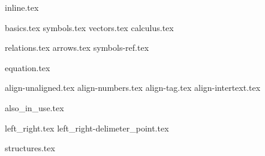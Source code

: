 \documentclass[presentatie.tex]{subfiles}
\begin{document}

\clearrecentlist

{inline.tex}

{basics.tex}
{symbols.tex}
{vectors.tex}
{calculus.tex}

{relations.tex}
{arrows.tex}
{symbols-ref.tex}

{equation.tex}


{align-unaligned.tex}
{align-numbers.tex}
{align-tag.tex}
{align-intertext.tex}

{also_in_use.tex}

{left_right.tex}
{left_right-delimeter_point.tex}

{structures.tex}
\end{document}
